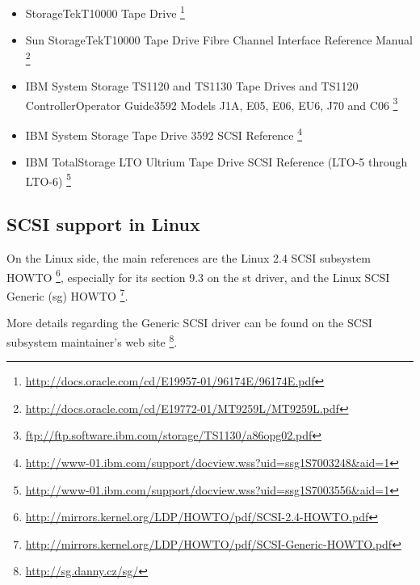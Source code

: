 \begin{itemize}
\item{}StorageTek\texttrademark T10000 Tape Drive
       \footnote{ \href{http://docs.oracle.com/cd/E19957-01/96174E/96174E.pdf}
                       {http://docs.oracle.com/cd/E19957-01/96174E/96174E.pdf} }
\item{}Sun StorageTek\texttrademark T10000 Tape Drive Fibre Channel Interface Reference Manual
       \footnote{ \href{http://docs.oracle.com/cd/E19772-01/MT9259L/MT9259L.pdf}
                       {http://docs.oracle.com/cd/E19772-01/MT9259L/MT9259L.pdf} }
\item{}IBM System Storage TS1120 and TS1130 Tape Drives and TS1120 ControllerOperator Guide3592 Models J1A, E05, E06, EU6, J70 and C06
       \footnote{ \href{ftp://ftp.software.ibm.com/storage/TS1130/a86opg02.pdf}
                       {ftp://ftp.software.ibm.com/storage/TS1130/a86opg02.pdf} }
\item{}IBM System Storage Tape Drive 3592 SCSI Reference
       \footnote{ \href{http://www-01.ibm.com/support/docview.wss?uid=ssg1S7003248\&aid=1}
                       {http://www-01.ibm.com/support/docview.wss?uid=ssg1S7003248\&aid=1} }
\item{}IBM TotalStorage LTO Ultrium Tape Drive SCSI Reference  (LTO-5 through LTO-6)
       \footnote{ \href{http://www-01.ibm.com/support/docview.wss?uid=ssg1S7003556\&aid=1}
                       {http://www-01.ibm.com/support/docview.wss?uid=ssg1S7003556\&aid=1} }
\end{itemize}

\subsection{SCSI support in Linux}
On the Linux side, the main references are the Linux 2.4 SCSI subsystem HOWTO
       \footnote{ \href{http://mirrors.kernel.org/LDP/HOWTO/pdf/SCSI-2.4-HOWTO.pdf}
                       {http://mirrors.kernel.org/LDP/HOWTO/pdf/SCSI-2.4-HOWTO.pdf} },
especially for its section 9.3 on the st driver,
and the Linux SCSI Generic (sg) HOWTO 
       \footnote{ \href{http://mirrors.kernel.org/LDP/HOWTO/pdf/SCSI-Generic-HOWTO.pdf}
                       {http://mirrors.kernel.org/LDP/HOWTO/pdf/SCSI-Generic-HOWTO.pdf} }. 

More details regarding the Generic SCSI driver can be found on the SCSI subsystem maintainer's web site 
       \footnote{ \href{http://sg.danny.cz/sg/}{http://sg.danny.cz/sg/} }.


